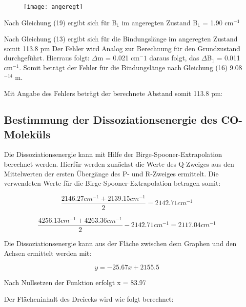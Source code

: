\documentclass[12pt]{article}
\begin{document}
 \begin{figure}[H]
\centering
\texttt{[image: angeregt]}

\end{figure} 

 
 Nach Gleichung (19) ergibt sich für B$_1$ im angeregten Zustand  B$_1$ = 1.90 cm$^{-1}$
 
 Nach Gleichung (13) ergibt sich für die Bindungslänge im angeregten Zustand somit 113.8 pm  Der Fehler wird Analog zur Berechnung für den Grundzustand durchgeführt. 
 Hierraus folgt:
$\Delta$m = 0.021 cm$^-1$ daraus folgt, das $\Delta$B$_1$ = 0.011 cm$^{-1}$. Somit beträgt der Fehler für die Bindungslänge nach Gleichung (16) 9.08$^{-14}$ m.

Mit Angabe des Fehlers beträgt der berechnete Abstand somit 113.8  pm:


\subsection{Bestimmung der Dissoziationsenergie des CO-Moleküls}

Die Dissoziationsenergie kann mit Hilfe der Birge-Spooner-Extrapolation berechnet werden. Hierfür werden zunächst die Werte des Q-Zweiges aus den Mittelwerten der ersten Übergänge des P- und R-Zweiges ermittelt.
Die verwendeten Werte für die Birge-Spooner-Extrapolation betragen somit:

\begin{equation}
    \frac{2146.27cm^{-1}+2139.15cm^{-1}}{2}= 2142.71 cm^{-1}
\end{equation}

\begin{equation}
    \frac{4256.13cm^{-1}+4263.36cm^{-1}}{2}-2142.71cm^{-1}= 2117.04cm^{-1}
\end{equation}

Die Dissoziationsenergie kann aus der Fläche zwischen dem Graphen und den Achsen ermittelt werden mit:


\begin{equation}
    y= -25.67x+2155.5
\end{equation}

Nach Nullsetzen der Funktion erfolgt x = 83.97

Der Flächeninhalt des Dreiecks wird wie folgt berechnet:
\end{document}

